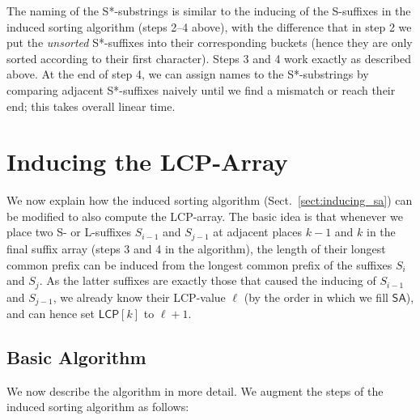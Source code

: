 \documentclass[11pt,onecolumn,final]{article} \usepackage[latin1]{inputenc}
\newcommand{\LCP}[0]{\mathsf{LCP}}
\newcommand{\SA}[0]{\mathsf{SA}}
\newcommand{\SF}[1]{S_{#1}}
\theoremstyle{plain}
\theoremstyle{remark}
\begin{document}
The naming of the S*-substrings is similar to the inducing of the S-suffixes in the induced sorting algorithm (steps 2--4 above), with the difference that in step 2 we put the \emph{unsorted} S*-suffixes into their corresponding buckets (hence they are only sorted according to their first character). Steps 3 and 4 work exactly as described above. At the end of step 4, we can assign names to the S*-substrings by comparing adjacent S*-suffixes naively until we find a mismatch or reach their end; this takes overall linear time.

\section{Inducing the LCP-Array}
\label{sect:inducing_lcp}
We now explain how the induced sorting algorithm (Sect.~\ref{sect:inducing_sa}) can be modified to also compute the LCP-array. The basic idea is that whenever we place two S- or L-suffixes $\SF{i-1}$ and $\SF{j-1}$ at adjacent places $k-1$ and $k$ in the final suffix array (steps 3 and 4 in the algorithm), the length of their longest common prefix can be induced from the longest common prefix of the suffixes $\SF{i}$ and $\SF{j}$. As the latter suffixes are exactly those that caused the inducing of $\SF{i-1}$ and $\SF{j-1}$, we already know their LCP-value $\ell$ (by the order in which we fill $\SA$), and can hence set $\LCP[k]$ to $\ell+1$.

\subsection{Basic Algorithm}
We now describe the algorithm in more detail. We augment the steps of the induced sorting algorithm as follows:
\end{document}
